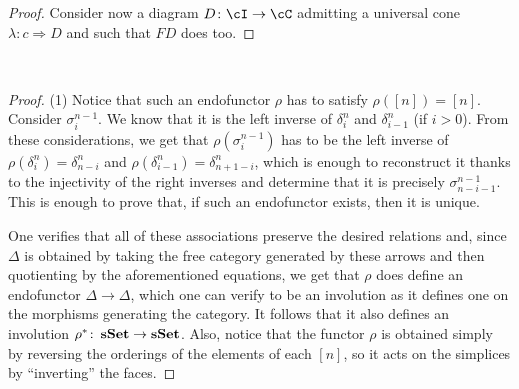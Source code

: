 \documentclass[a4paper,11pt,openany]{scrartcl}
\begin{document}
\begin{proof}
    Consider now a diagram $D\colon\cI\rightarrow\cC$ admitting a universal cone
    $\lambda\colon c\Rightarrow D$ and such that $FD$ does too.
\end{proof}

~\\
\begin{proof}
    (1) Notice that such an endofunctor $\rho$ has to satisfy $\rho([n])=[n]$.
    Consider $\sigma^{n-1}_i$. We know that it is the left inverse of
    $\delta^n_i$ and $\delta^n_{i-1}$ (if $i>0$). From these considerations, we
    get that $\rho(\sigma^{n-1}_i)$ has to be the left inverse of
    $\rho(\delta^n_i)=\delta^n_{n-i}$ and
    $\rho(\delta^n_{i-1})=\delta^n_{n+1-i}$, which is enough to reconstruct it
    thanks to the injectivity of the right inverses and determine that it is
    precisely $\sigma^{n-1}_{n-i-1}$. This is enough to prove that, if such an
    endofunctor exists, then it is unique.

    One verifies that all of these associations preserve the desired relations
    and, since $\Delta$ is obtained by taking the free category generated by
    these arrows and then quotienting by the aforementioned equations, we get
    that $\rho$ does define an endofunctor $\Delta\rightarrow\Delta$, which one
    can verify to be an involution as it defines one on the morphisms
    generating the category. It follows that it also defines an involution
    $\rho^*\colon\operatorname{\mathbf{sSet}}\rightarrow\operatorname{\mathbf{sSet}}$. Also, notice that the functor $\rho$ is
    obtained simply by reversing the orderings of the elements of each $[n]$, so
    it acts on the simplices by ``inverting'' the faces.


\end{proof}
\end{document}
